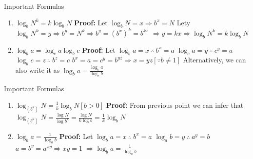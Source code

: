\documentclass[aspectratio=1610,8pt]{beamer}
\newcounter{counter}
\begin{document}
\begin{frame}{Important Formulas}
  \begin{enumerate}
    \setcounter{enumi}{\value{counter}}
  \item $\log_bN^k = k\log_bN$
    \linebreak\linebreak
    \textbf{Proof:} Let $\log_b N = x\Rightarrow b^x = N$
    \linebreak\linebreak
    Lety $\log_bN^k = y \Rightarrow b^y = N^k \Rightarrow b^y = (b^x)^k = b^{kx}$
    \linebreak\linebreak
    $\Rightarrow y = kx \Rightarrow \log_bN^k = k\log_bN$
  \item $\log_ba = \log_ca\log_bc$
    \linebreak\linebreak
    \textbf{Proof:} Let $\log_ba = x~ \therefore~ b^x = a$
    \linebreak\linebreak
    $\log_ca = y~\therefore~c^y = a$
    \linebreak\linebreak
    $\log_bc = z~\therefore~ b^z = c$
    \linebreak\linebreak
    $b^x = a = c^y = b^{yz}\Rightarrow x = yz[\because b\neq 1]$
    \linebreak\linebreak
    Alternatively, we can also write it as $\log_ba = \frac{\log_ca}{\log_cb}$
    \setcounter{counter}{\value{enumi}}
  \end{enumerate}
\end{frame}
\begin{frame}{Important Formulas}
  \begin{enumerate}
    \setcounter{enumi}{\value{counter}}
  \item $\log_{(b^k)}N = \frac{1}{k}\log_b N[b > 0]$
    \linebreak\linebreak
    \textbf{Proof:} From previous point we can infer that $\log_{(b^k)}N = \frac{\log N}{\log b^k} = \frac{\log N}{k\log b} =
    \frac{1}{k}\log_bN$
  \item $\log_ba = \frac{1}{\log_ab}$
    \linebreak\linebreak
    \textbf{Proof:} Let $\log_ba = x~\therefore ~b^x = a$
    \linebreak\linebreak
    $\log_ab = y~\therefore ~a^y = b$
    \linebreak\linebreak
    $a = b^y = a^{xy}\Rightarrow xy = 1$
    \linebreak\linebreak
    $\Rightarrow \log_ba = \frac{1}{\log_ab}$
  \end{enumerate}
\end{frame}
\end{document}
